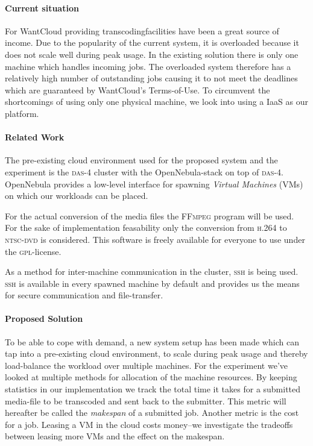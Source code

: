 \paragraph{Current situation}
For WantCloud providing transcoding\footnotemark facilities have been
a great source of income. Due to the popularity of the current system,
it is overloaded because it does not scale well during peak usage. In
the existing solution there is only one machine which handles incoming
jobs. The overloaded system therefore has a relatively high number of
outstanding jobs causing it to not meet the deadlines which are
guaranteed by WantCloud's Terms-of-Use. To circumvent the shortcomings
of using only one physical machine, we look into using a IaaS as our
platform.

\paragraph{Related Work}
The pre-existing cloud environment used for the proposed system and
the experiment is the \textsc{das-4}\cite{URL:DAS4} cluster with the
OpenNebula\cite{URL:OpenNebula}-stack on top of \textsc{das-4}. OpenNebula
provides a low-level interface for spawning \emph{Virtual Machines}
(VMs) on which our workloads can be placed.

For the actual conversion of the media files the
\textsc{FFmpeg}\cite{URL:FFmpeg} program
will be used. For the sake of implementation feasability only the
conversion from \textsc{h.264}\cite{Standard:H264} to \textsc{ntsc-dvd}
is considered. This software is freely available for everyone to use
under the \textsc{gpl}-license.

As a method for inter-machine communication in the cluster,
\textsc{ssh} is being used. \textsc{ssh} is available in every spawned
machine by default and provides us the means for secure communication
and file-transfer.

\paragraph{Proposed Solution}
To be able to cope with demand, a new system setup has been made which
can tap into a pre-existing cloud environment, to scale during peak
usage and thereby load-balance the workload over multiple
machines. For the experiment we've looked at multiple methods for
allocation of the machine resources. By keeping statistics in our
implementation we track the total time it takes for a submitted
media-file to be transcoded and sent back to the submitter. This
metric will hereafter be called the \emph{makespan} of a submitted
job. Another metric is the cost for a job. Leasing a VM in the cloud
costs money--we investigate the tradeoffs between leasing more VMs
and the effect on the makespan.

